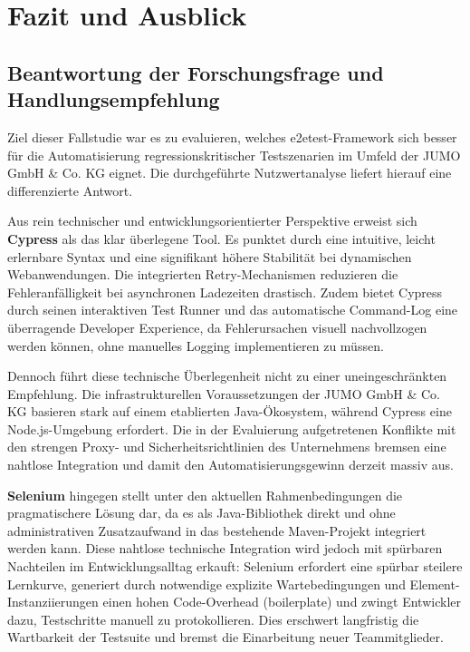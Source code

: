 
\section{Fazit und Ausblick}
\label{ch:fazit}

\subsection{Beantwortung der Forschungsfrage und Handlungsempfehlung}
\label{sec:beantwortung_forschungsfrage}

Ziel dieser Fallstudie war es zu evaluieren, welches \gls{e2etest}-Framework sich besser für die Automatisierung regressionskritischer Testszenarien im Umfeld der JUMO GmbH \& Co. KG eignet. Die durchgeführte Nutzwertanalyse liefert hierauf eine differenzierte Antwort.

Aus rein technischer und entwicklungsorientierter Perspektive erweist sich \textbf{Cypress} als das klar überlegene Tool. Es punktet durch eine intuitive, leicht erlernbare Syntax und eine signifikant höhere Stabilität bei dynamischen Webanwendungen. Die integrierten Retry-Mechanismen reduzieren die Fehleranfälligkeit bei asynchronen Ladezeiten drastisch. Zudem bietet Cypress durch seinen interaktiven Test Runner und das automatische Command-Log eine überragende Developer Experience, da Fehlerursachen visuell nachvollzogen werden können, ohne manuelles Logging implementieren zu müssen.

Dennoch führt diese technische Überlegenheit nicht zu einer uneingeschränkten Empfehlung. Die infrastrukturellen Voraussetzungen der JUMO GmbH \& Co. KG basieren stark auf einem etablierten Java-Ökosystem, während Cypress eine Node.js-Umgebung erfordert. Die in der Evaluierung aufgetretenen Konflikte mit den strengen Proxy- und Sicherheitsrichtlinien des Unternehmens bremsen eine nahtlose Integration und damit den Automatisierungsgewinn derzeit massiv aus.

\textbf{Selenium} hingegen stellt unter den aktuellen Rahmenbedingungen die pragmatischere Lösung dar, da es als Java-Bibliothek direkt und ohne administrativen Zusatzaufwand in das bestehende Maven-Projekt integriert werden kann. Diese nahtlose technische Integration wird jedoch mit spürbaren Nachteilen im Entwicklungsalltag erkauft: Selenium erfordert eine spürbar steilere Lernkurve, generiert durch notwendige explizite Wartebedingungen und Element-Instanziierungen einen hohen Code-Overhead (\gls{boilerplate}) und zwingt Entwickler dazu, Testschritte manuell zu protokollieren. Dies erschwert langfristig die Wartbarkeit der Testsuite und bremst die Einarbeitung neuer Teammitglieder.

